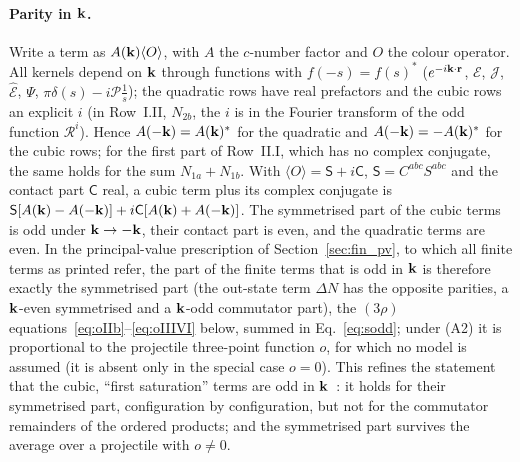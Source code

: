 \paragraph{Parity in $\mathbf{k}$.} Write a term as $A(\mathbf{k})\langle O\rangle$, with $A$ the $c$-number factor and $O$ the colour operator. All kernels depend on $\mathbf{k}$ through functions with $f(-s)=f(s)^*$ ($e^{-i\mathbf{k}\cdot\mathbf{r}}$, $\mathcal E$, $\mathcal J$, $\widehat{\mathcal E}$, $\Psi$, $\pi\delta(s)-i\mathcal P\frac1s$); the quadratic rows have real prefactors and the cubic rows an explicit $i$ (in Row~I.II, $N_{2b}$, the $i$ is in the Fourier transform of the odd function $\mathcal R^i$). Hence $A(-\mathbf{k})=A(\mathbf{k})^*$ for the quadratic and $A(-\mathbf{k})=-A(\mathbf{k})^*$ for the cubic rows; for the first part of Row~II.I, which has no complex conjugate, the same holds for the sum $N_{1a}+N_{1b}$. With $\langle O\rangle=\mathsf S+i\mathsf C$, $\mathsf S=C^{abc}S^{abc}$ and the contact part $\mathsf C$ real, a cubic term plus its complex conjugate is $\mathsf S[A(\mathbf{k})-A(-\mathbf{k})]+i\mathsf C[A(\mathbf{k})+A(-\mathbf{k})]$. The symmetrised part of the cubic terms is odd under $\mathbf{k}\to-\mathbf{k}$, their contact part is even, and the quadratic terms are even. In the principal-value prescription of Section~\ref{sec:fin_pv}, to which all finite terms as printed refer, the part of the finite terms that is odd in $\mathbf{k}$ is therefore exactly the symmetrised part (the out-state term $\Delta N$ has the opposite parities, a $\mathbf{k}$-even symmetrised and a $\mathbf{k}$-odd commutator part), the $(3\rho)$ equations~\eqref{eq:oIIb}--\eqref{eq:oIIIVI} below, summed in Eq.~\eqref{eq:sodd}; under (A2) it is proportional to the projectile three-point function $o$, for which no model is assumed (it is absent only in the special case $o=0$). This refines the statement that the cubic, ``first saturation'' terms are odd in $\mathbf{k}$~\cite{McLerran:2016snu,Kovchegov:2018jun}: it holds for their symmetrised part, configuration by configuration, but not for the commutator remainders of the ordered products; and the symmetrised part survives the average over a projectile with $o\neq0$.

